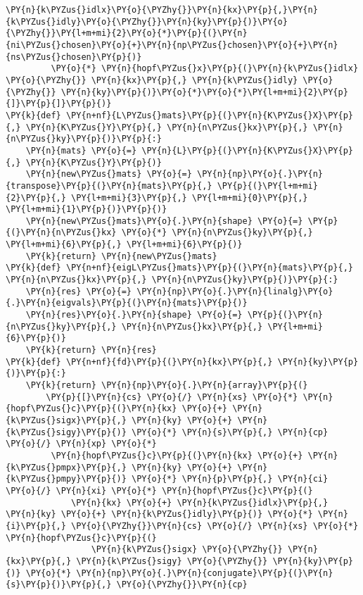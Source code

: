 \begin{Verbatim}[commandchars=\\\{\}]
            \PY{n}{k\PYZus{}idlx}\PY{o}{\PYZhy{}}\PY{n}{kx}\PY{p}{,}\PY{n}{k\PYZus{}idly}\PY{o}{\PYZhy{}}\PY{n}{ky}\PY{p}{)}\PY{o}{\PYZhy{}}\PY{l+m+mi}{2}\PY{o}{*}\PY{p}{(}\PY{n}{ni\PYZus{}chosen}\PY{o}{+}\PY{n}{np\PYZus{}chosen}\PY{o}{+}\PY{n}{ns\PYZus{}chosen}\PY{p}{)}
         \PY{o}{*} \PY{n}{hopf\PYZus{}x}\PY{p}{(}\PY{n}{k\PYZus{}idlx} \PY{o}{\PYZhy{}} \PY{n}{kx}\PY{p}{,} \PY{n}{k\PYZus{}idly} \PY{o}{\PYZhy{}} \PY{n}{ky}\PY{p}{)}\PY{o}{*}\PY{o}{*}\PY{l+m+mi}{2}\PY{p}{]}\PY{p}{]}\PY{p}{)}
\PY{k}{def} \PY{n+nf}{L\PYZus{}mats}\PY{p}{(}\PY{n}{K\PYZus{}X}\PY{p}{,} \PY{n}{K\PYZus{}Y}\PY{p}{,} \PY{n}{n\PYZus{}kx}\PY{p}{,} \PY{n}{n\PYZus{}ky}\PY{p}{)}\PY{p}{:}
    \PY{n}{mats} \PY{o}{=} \PY{n}{L}\PY{p}{(}\PY{n}{K\PYZus{}X}\PY{p}{,} \PY{n}{K\PYZus{}Y}\PY{p}{)}
    \PY{n}{new\PYZus{}mats} \PY{o}{=} \PY{n}{np}\PY{o}{.}\PY{n}{transpose}\PY{p}{(}\PY{n}{mats}\PY{p}{,} \PY{p}{(}\PY{l+m+mi}{2}\PY{p}{,} \PY{l+m+mi}{3}\PY{p}{,} \PY{l+m+mi}{0}\PY{p}{,} \PY{l+m+mi}{1}\PY{p}{)}\PY{p}{)}
    \PY{n}{new\PYZus{}mats}\PY{o}{.}\PY{n}{shape} \PY{o}{=} \PY{p}{(}\PY{n}{n\PYZus{}kx} \PY{o}{*} \PY{n}{n\PYZus{}ky}\PY{p}{,} \PY{l+m+mi}{6}\PY{p}{,} \PY{l+m+mi}{6}\PY{p}{)}
    \PY{k}{return} \PY{n}{new\PYZus{}mats}
\PY{k}{def} \PY{n+nf}{eigL\PYZus{}mats}\PY{p}{(}\PY{n}{mats}\PY{p}{,} \PY{n}{n\PYZus{}kx}\PY{p}{,} \PY{n}{n\PYZus{}ky}\PY{p}{)}\PY{p}{:}
    \PY{n}{res} \PY{o}{=} \PY{n}{np}\PY{o}{.}\PY{n}{linalg}\PY{o}{.}\PY{n}{eigvals}\PY{p}{(}\PY{n}{mats}\PY{p}{)}
    \PY{n}{res}\PY{o}{.}\PY{n}{shape} \PY{o}{=} \PY{p}{(}\PY{n}{n\PYZus{}ky}\PY{p}{,} \PY{n}{n\PYZus{}kx}\PY{p}{,} \PY{l+m+mi}{6}\PY{p}{)}
    \PY{k}{return} \PY{n}{res}
\PY{k}{def} \PY{n+nf}{fd}\PY{p}{(}\PY{n}{kx}\PY{p}{,} \PY{n}{ky}\PY{p}{)}\PY{p}{:}
    \PY{k}{return} \PY{n}{np}\PY{o}{.}\PY{n}{array}\PY{p}{(}
        \PY{p}{[}\PY{n}{cs} \PY{o}{/} \PY{n}{xs} \PY{o}{*} \PY{n}{hopf\PYZus{}c}\PY{p}{(}\PY{n}{kx} \PY{o}{+} \PY{n}{k\PYZus{}sigx}\PY{p}{,} \PY{n}{ky} \PY{o}{+} \PY{n}{k\PYZus{}sigy}\PY{p}{)} \PY{o}{*} \PY{n}{s}\PY{p}{,} \PY{n}{cp} \PY{o}{/} \PY{n}{xp} \PY{o}{*}
         \PY{n}{hopf\PYZus{}c}\PY{p}{(}\PY{n}{kx} \PY{o}{+} \PY{n}{k\PYZus{}pmpx}\PY{p}{,} \PY{n}{ky} \PY{o}{+} \PY{n}{k\PYZus{}pmpy}\PY{p}{)} \PY{o}{*} \PY{n}{p}\PY{p}{,} \PY{n}{ci} \PY{o}{/} \PY{n}{xi} \PY{o}{*} \PY{n}{hopf\PYZus{}c}\PY{p}{(}
             \PY{n}{kx} \PY{o}{+} \PY{n}{k\PYZus{}idlx}\PY{p}{,} \PY{n}{ky} \PY{o}{+} \PY{n}{k\PYZus{}idly}\PY{p}{)} \PY{o}{*} \PY{n}{i}\PY{p}{,} \PY{o}{\PYZhy{}}\PY{n}{cs} \PY{o}{/} \PY{n}{xs} \PY{o}{*} \PY{n}{hopf\PYZus{}c}\PY{p}{(}
                 \PY{n}{k\PYZus{}sigx} \PY{o}{\PYZhy{}} \PY{n}{kx}\PY{p}{,} \PY{n}{k\PYZus{}sigy} \PY{o}{\PYZhy{}} \PY{n}{ky}\PY{p}{)} \PY{o}{*} \PY{n}{np}\PY{o}{.}\PY{n}{conjugate}\PY{p}{(}\PY{n}{s}\PY{p}{)}\PY{p}{,} \PY{o}{\PYZhy{}}\PY{n}{cp}

\end{Verbatim}
